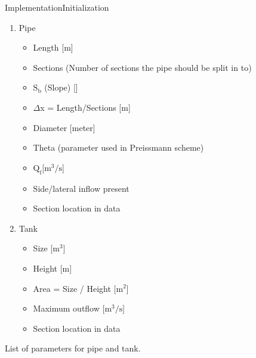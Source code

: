 \begin{frame}{Implementation}{Initialization}
    
\begin{table}[H]
\begin{enumerate} 
	\item Pipe
	\begin{itemize}
		\item Length [m]
		\item Sections (Number of sections the pipe should be split in to)
		\item $\text{S}_\text{b}$ (Slope) [\textperthousand]
		\item $\Delta$x = Length/Sections [m]
		\item Diameter [meter]
		\item Theta (parameter used in Preissmann scheme)
		\item $\text{Q}_{\text{f}}$[$\text{m}^\text{3}/\text{s}$]
		\item Side/lateral inflow present 
		\item Section location in data 
	\end{itemize}
	\item Tank
	\begin{itemize}
		\item Size [$\text{m}^\text{3}$]
		\item Height [m]
		\item Area = Size / Height [$\text{m}^\text{2}$]
		\item Maximum outflow [$\text{m}^\text{3}/\text{s}$]
		\item Section location in data 
	\end{itemize}
	
\end{enumerate}
\caption{List of parameters for pipe and tank.}
\label{tab:init_list}
\end{table}

\end{frame}


